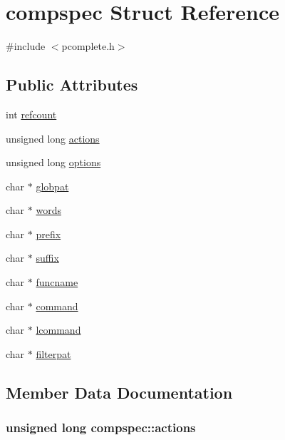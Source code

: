 \hypertarget{structcompspec}{}\section{compspec Struct Reference}
\label{structcompspec}


{\ttfamily \#include $<$pcomplete.\+h$>$}

\subsection*{Public Attributes}
\begin{DoxyCompactItemize}
\item 
int \hyperlink{structcompspec_a6b159ff5d4155e6db4cf8d00be5577b1}{refcount}
\item 
unsigned long \hyperlink{structcompspec_a7fde3c9ac7d3323ae168e23a25f4ea70}{actions}
\item 
unsigned long \hyperlink{structcompspec_abb41177107193c72d4e4a729dd9ca3e2}{options}
\item 
char $\ast$ \hyperlink{structcompspec_af2b50da25665b42339ff1706218a8336}{globpat}
\item 
char $\ast$ \hyperlink{structcompspec_aa45815ac115fd9e28a3794181b9a4cf6}{words}
\item 
char $\ast$ \hyperlink{structcompspec_a484aa9fab29856c726e7998f1b176a33}{prefix}
\item 
char $\ast$ \hyperlink{structcompspec_ad4c0b13772afa88fec5024829e608b53}{suffix}
\item 
char $\ast$ \hyperlink{structcompspec_a286bad7bae59e72673a3e06013a710b2}{funcname}
\item 
char $\ast$ \hyperlink{structcompspec_a925612fb509ec4ae1e62478d62e9877a}{command}
\item 
char $\ast$ \hyperlink{structcompspec_abf203174fce2dd17b9ab2e9bd6108389}{lcommand}
\item 
char $\ast$ \hyperlink{structcompspec_ab33895496e7bcf808b84573578099835}{filterpat}
\end{DoxyCompactItemize}


\subsection{Member Data Documentation}
\subsubsection[{\texorpdfstring{actions}{actions}}]{\setlength{\rightskip}{0pt plus 5cm}unsigned long compspec\+::actions}\hypertarget{structcompspec_a7fde3c9ac7d3323ae168e23a25f4ea70}{}\label{structcompspec_a7fde3c9ac7d3323ae168e23a25f4ea70}
